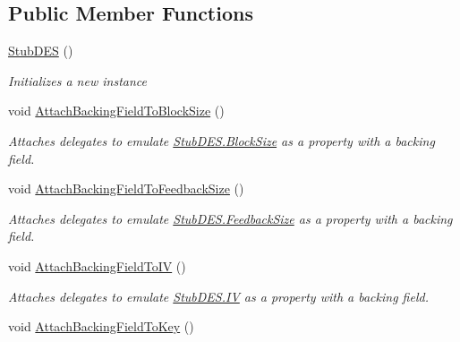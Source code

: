 \subsection*{Public Member Functions}
\begin{DoxyCompactItemize}
\item 
\hyperlink{class_system_1_1_security_1_1_cryptography_1_1_fakes_1_1_stub_d_e_s_a3ed058468102eb719211fba700a376b0}{Stub\-D\-E\-S} ()
\begin{DoxyCompactList}\small\item\em Initializes a new instance\end{DoxyCompactList}\item 
void \hyperlink{class_system_1_1_security_1_1_cryptography_1_1_fakes_1_1_stub_d_e_s_a3fa5ac561353be28bf052bcb7d8b2d2d}{Attach\-Backing\-Field\-To\-Block\-Size} ()
\begin{DoxyCompactList}\small\item\em Attaches delegates to emulate \hyperlink{class_system_1_1_security_1_1_cryptography_1_1_fakes_1_1_stub_d_e_s_a64bd353d59072c88d74c4a4eb42fce02}{Stub\-D\-E\-S.\-Block\-Size} as a property with a backing field.\end{DoxyCompactList}\item 
void \hyperlink{class_system_1_1_security_1_1_cryptography_1_1_fakes_1_1_stub_d_e_s_a87ea2cdc287908cd296063d8d6034647}{Attach\-Backing\-Field\-To\-Feedback\-Size} ()
\begin{DoxyCompactList}\small\item\em Attaches delegates to emulate \hyperlink{class_system_1_1_security_1_1_cryptography_1_1_fakes_1_1_stub_d_e_s_a31b7cb4535d9be85c9326d0d8f2628a6}{Stub\-D\-E\-S.\-Feedback\-Size} as a property with a backing field.\end{DoxyCompactList}\item 
void \hyperlink{class_system_1_1_security_1_1_cryptography_1_1_fakes_1_1_stub_d_e_s_a462c394c5a9142935922b08207a00481}{Attach\-Backing\-Field\-To\-I\-V} ()
\begin{DoxyCompactList}\small\item\em Attaches delegates to emulate \hyperlink{class_system_1_1_security_1_1_cryptography_1_1_fakes_1_1_stub_d_e_s_acb87dd4ff9e3892aea49a716985fab15}{Stub\-D\-E\-S.\-I\-V} as a property with a backing field.\end{DoxyCompactList}\item 
void \hyperlink{class_system_1_1_security_1_1_cryptography_1_1_fakes_1_1_stub_d_e_s_a734fd8f538637ea5f698203f40c5f4f7}{Attach\-Backing\-Field\-To\-Key} ()

\end{DoxyCompactItemize}
